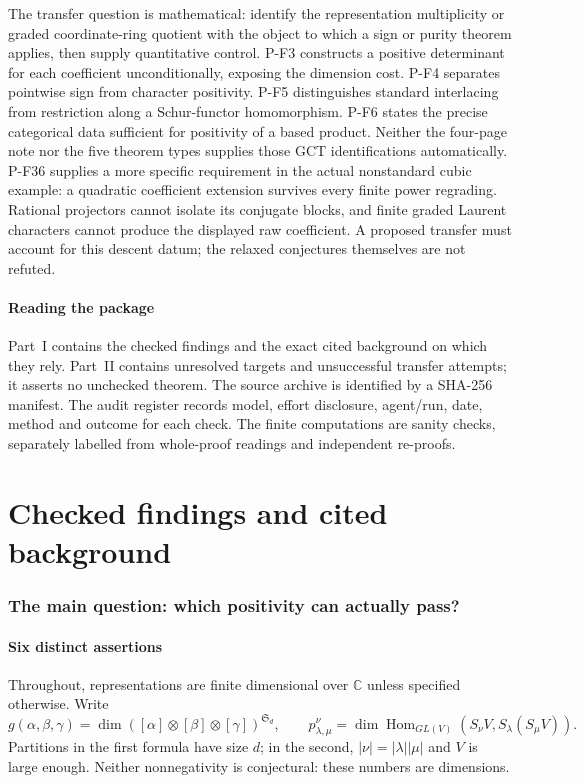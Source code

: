 \documentclass[11pt,a4paper]{article}
\begin{document}
The transfer question is mathematical: identify the representation
multiplicity or graded coordinate-ring quotient with the object to which
a sign or purity theorem applies, then supply quantitative control.
P-F3 constructs a positive determinant for each coefficient
unconditionally, exposing the dimension cost. P-F4 separates pointwise
sign from character positivity. P-F5 distinguishes standard interlacing
from restriction along a Schur-functor homomorphism. P-F6 states the
precise categorical data sufficient for positivity of a based product.
Neither the four-page note nor the five theorem types supplies those GCT
identifications automatically.
P-F36 supplies a more specific requirement in the actual nonstandard
cubic example: a quadratic coefficient extension survives every
finite power regrading. Rational projectors cannot isolate its
conjugate blocks, and finite graded Laurent characters cannot
produce the displayed raw coefficient. A proposed transfer must
account for this descent datum; the relaxed conjectures themselves
are not refuted.

\subsection*{Reading the package}
Part~I contains the checked findings and the exact cited background on
which they rely. Part~II contains unresolved targets and unsuccessful
transfer attempts; it asserts no unchecked theorem. The source archive
is identified by a SHA-256 manifest. The audit register records model,
effort disclosure, agent/run, date, method and outcome for each check.
The finite computations are sanity checks, separately labelled from
whole-proof readings and independent re-proofs.


\clearpage\part{Checked findings and cited background}

\section{The main question: which positivity can actually pass?}
\label{sec:positivity}

\subsection{Six distinct assertions}
Throughout, representations are finite dimensional over $\mathbb C$ unless
specified otherwise. Write
\[
 g(\alpha,\beta,\gamma)
 =\dim([\alpha]\otimes[\beta]\otimes[\gamma])^{\mathfrak S_d},
 \qquad
 p_{\lambda,\mu}^{\nu}
 =\dim\operatorname{Hom}_{GL(V)}
     (S_\nu V,S_\lambda(S_\mu V)).
\]
Partitions in the first formula have size $d$; in the second,
$|\nu|=|\lambda||\mu|$ and $V$ is large enough. Neither nonnegativity is
conjectural: these numbers are dimensions.
\end{document}
